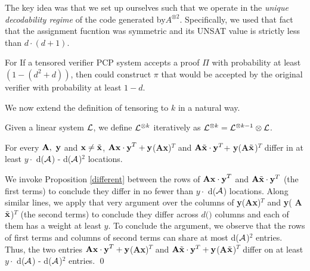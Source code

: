 {The key idea was that we set up ourselves such that we operate in the
{\em unique decodability regime} of the code generated by$A^{\otimes
  2}$. Specifically, we used that fact that the assignment fucntion
was symmetric and its UNSAT value is strictly less than $d \cdot (d +
1)$.


\begin{corollary}
  For If a tensored verifier PCP system accepts a proof $\Pi$ with
  probability at least $(1 - (d^2 +d))$, then could construct ${\pi}$
  that would be accepted by the original verifier with probability at
  least $1 - d$.
\end{corollary}


We now extend the definition of tensoring to $k$ in a natural way.
\begin{definition}
  Given a linear system ${\cal L}$, we define ${\cal L}^{\otimes k}$ iteratively
  as ${\cal L}^{\otimes k} = {\cal L}^{\otimes k-1} \otimes {\cal L}$.
\end{definition}





\begin{proposition}\label{nearly-there}
  For every ${\bf A,\ y}$ and ${\bf x} \ne \tilde{\bf x}$, ${\bf
    Ax\cdot y}^T + {\bf y}$({\bf Ax})$^T$ and ${\bf A} \tilde{\bf x}\cdot
    {\bf y}^T$+ {\bf y}({\bf A}$\tilde{\bf x}$)$^T$ differ in at least $y
  \cdot$ d(${\cal A}$) - d(${\cal A}$)$^2$ locations.
\end{proposition}
  We invoke Proposition \ref{different} between
the rows of ${\bf Ax\cdot y}^T$ and ${\bf A} \tilde{\bf x}\cdot {\bf
  y}^T$ (the first terms) to conclude they differ in no fewer than $y
\cdot$ d(${\cal A}$) locations. Along similar lines, we apply that very
argument over the columns of {\bf y}({\bf Ax})$^T$ and {\bf y}({\bf
  A}$\tilde{\bf x}$)$^T$ (the second terms) to conclude they differ
across $d($\A$)$ columns and each of them has a weight at least $y$.
To conclude the argument, we observe that the rows of first terms and
columns of second terms can share at most d(${\cal A}$)$^2$ entries. Thus,
the two entries ${\bf Ax\cdot y}^T + {\bf y}$({\bf Ax})$^T$ and ${\bf
  A} \tilde{\bf x}\cdot {\bf y}^T + {\bf y}$({\bf A}$\tilde{\bf
  x}$)$^T$ differ on at least $y \cdot$ d(${\cal A}$) - d(${\cal A}$)$^2$
entries. \qed


}
